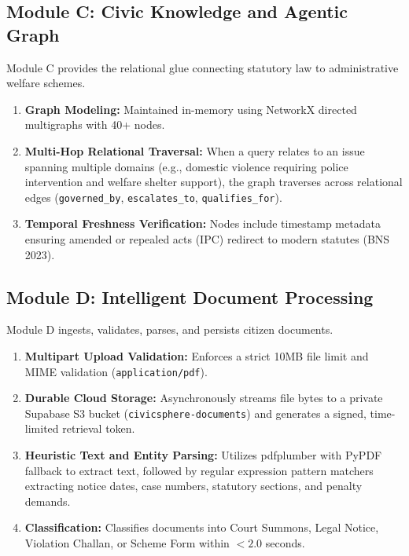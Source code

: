 \subsection{Module C: Civic Knowledge and Agentic Graph}
Module C provides the relational glue connecting statutory law to administrative welfare schemes.
\begin{enumerate}
    \item \textbf{Graph Modeling:} Maintained in-memory using NetworkX directed multigraphs with 40+ nodes.
    \item \textbf{Multi-Hop Relational Traversal:} When a query relates to an issue spanning multiple domains (e.g., domestic violence requiring police intervention and welfare shelter support), the graph traverses across relational edges (\texttt{governed\_by}, \texttt{escalates\_to}, \texttt{qualifies\_for}).
    \item \textbf{Temporal Freshness Verification:} Nodes include timestamp metadata ensuring amended or repealed acts (IPC) redirect to modern statutes (BNS 2023).
\end{enumerate}

\subsection{Module D: Intelligent Document Processing}
Module D ingests, validates, parses, and persists citizen documents.
\begin{enumerate}
    \item \textbf{Multipart Upload Validation:} Enforces a strict 10MB file limit and MIME validation (\texttt{application/pdf}).
    \item \textbf{Durable Cloud Storage:} Asynchronously streams file bytes to a private Supabase S3 bucket (\texttt{civicsphere-documents}) and generates a signed, time-limited retrieval token.
    \item \textbf{Heuristic Text and Entity Parsing:} Utilizes pdfplumber with PyPDF fallback to extract text, followed by regular expression pattern matchers extracting notice dates, case numbers, statutory sections, and penalty demands.
    \item \textbf{Classification:} Classifies documents into Court Summons, Legal Notice, Violation Challan, or Scheme Form within $< 2.0$ seconds.
\end{enumerate}

